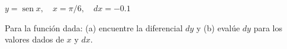 \item $y = \operatorname{sen} x, \quad x = \pi/6, \quad dx = -0.1$
\par
Para la función dada: (a) encuentre la diferencial $dy$ y (b) evalúe $dy$ para los valores dados de $x$ y $dx$.
